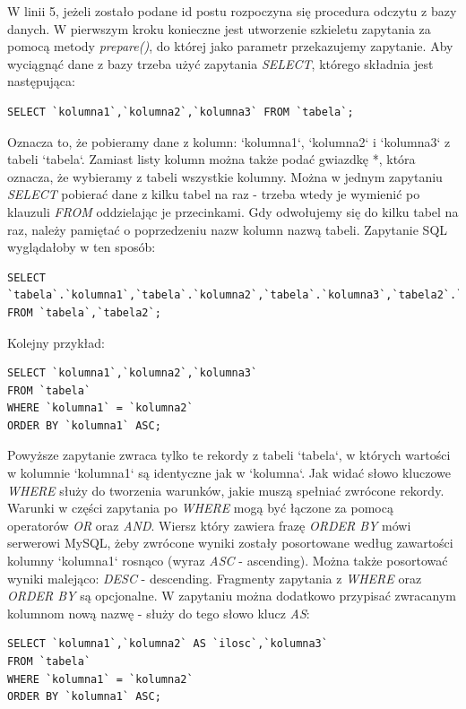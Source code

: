 \documentclass[a4paper,10pt]{article}
\begin{document}
W linii 5, jeżeli zostało podane id postu rozpoczyna się procedura odczytu z bazy danych. W pierwszym kroku konieczne jest utworzenie szkieletu zapytania za pomocą metody \textit{prepare()}, do której jako parametr przekazujemy zapytanie. Aby wyciągnąć dane z bazy trzeba użyć zapytania \textit{SELECT}, którego składnia jest następująca:\\
\begin{verbatim}
SELECT `kolumna1`,`kolumna2`,`kolumna3` FROM `tabela`;
\end{verbatim}
Oznacza to, że pobieramy dane z kolumn: `kolumna1`, `kolumna2` i `kolumna3` z tabeli `tabela`. Zamiast listy kolumn można także podać gwiazdkę *, która oznacza, że wybieramy z tabeli wszystkie kolumny. Można w jednym zapytaniu \textit{SELECT} pobierać dane z kilku tabel na raz - trzeba wtedy je wymienić po klauzuli \textit{FROM} oddzielając je przecinkami. Gdy odwołujemy się do kilku tabel na raz, należy pamiętać o poprzedzeniu nazw kolumn nazwą tabeli. Zapytanie SQL wyglądałoby w ten sposób: \\
\begin{verbatim}
SELECT `tabela`.`kolumna1`,`tabela`.`kolumna2`,`tabela`.`kolumna3`,`tabela2`.`kolumna5`
FROM `tabela`,`tabela2`;
\end{verbatim}
Kolejny przykład: \\
\begin{verbatim}
SELECT `kolumna1`,`kolumna2`,`kolumna3`
FROM `tabela`
WHERE `kolumna1` = `kolumna2`
ORDER BY `kolumna1` ASC;
\end{verbatim}
Powyższe zapytanie zwraca tylko te rekordy z tabeli `tabela`, w których wartości w kolumnie `kolumna1` są identyczne jak w `kolumna`. Jak widać słowo kluczowe \textit{WHERE} służy do tworzenia warunków, jakie muszą spełniać zwrócone rekordy. Warunki w części zapytania po \textit{WHERE} mogą być łączone za pomocą operatorów \textit{OR} oraz \textit{AND}. Wiersz który zawiera frazę \textit{ORDER BY} mówi serwerowi MySQL, żeby zwrócone wyniki zostały posortowane według zawartości kolumny `kolumna1` rosnąco (wyraz \textit{ASC} - ascending). Można także posortować wyniki malejąco: \textit{DESC} - descending. Fragmenty zapytania z \textit{WHERE} oraz \textit{ORDER BY} są opcjonalne. W zapytaniu można dodatkowo przypisać zwracanym kolumnom nową nazwę - służy do tego słowo klucz \textit{AS}: \\
\begin{verbatim}
SELECT `kolumna1`,`kolumna2` AS `ilosc`,`kolumna3`
FROM `tabela`
WHERE `kolumna1` = `kolumna2`
ORDER BY `kolumna1` ASC;
\end{verbatim}
\end{document}
